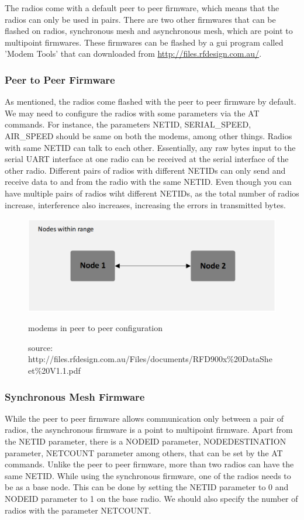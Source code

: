 The radios come with a default peer to peer firmware, which means that the radios can only be used in pairs. There are two other firmwares that can be flashed on radios, synchronous mesh and asynchronous mesh, which are point to multipoint firmwares. These firmwares can be flashed by a gui program called 'Modem Tools' that can downloaded from \url{http://files.rfdesign.com.au/}.

\subsubsection{Peer to Peer Firmware}
As mentioned, the radios come flashed with the peer to peer firmware by default. We may need to configure the radios with some parameters via the AT commands. For instance, the parameters NETID, SERIAL\_SPEED, AIR\_SPEED should be same on both the modems, among other things. Radios with same NETID can talk to each other. Essentially, any raw bytes input to the serial UART interface at one radio can be received at the serial interface of the other radio. Different pairs of radios with different NETIDs can only send and receive data to and from the radio with the same NETID. Even though you can have multiple pairs of radios wiht different NETIDs, as the total number of radios increase, interference also increases, increasing the errors in transmitted bytes.

\begin{figure}[h]
	\centering
	\includegraphics[scale=0.4]{Pictures/peer.png}
	\caption{modems in peer to peer configuration}
	\label{fig: rfdpeer}
	\caption*{source: http://files.rfdesign.com.au/Files/documents/RFD900x\%20DataSheet\%20V1.1.pdf}
\end{figure}

\subsubsection{Synchronous Mesh Firmware}
While the peer to peer firmware allows communication only between a pair of radios, the asynchronous firmware is a point to multipoint firmware. Apart from the NETID parameter, there is a NODEID parameter, NODEDESTINATION parameter, NETCOUNT parameter among others, that can be set by the AT commands. Unlike the peer to peer firmware, more than two radios can have the same NETID. While using the synchronous firmware, one of the radios needs to be as a base node. This can be done by setting the NETID parameter to 0 and NODEID parameter to 1 on the base radio. We should also specify the number of radios with the parameter NETCOUNT.

